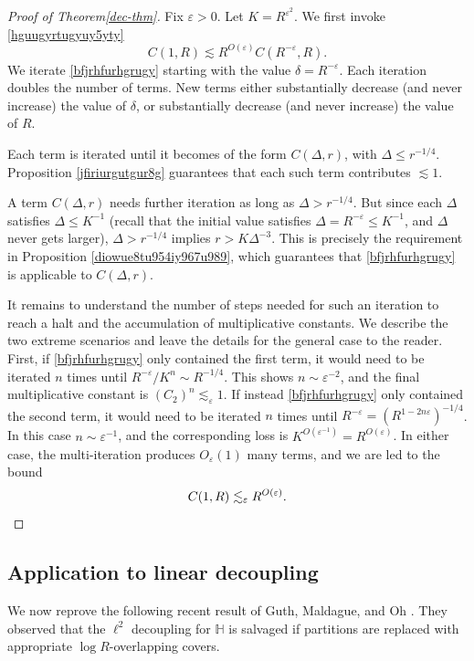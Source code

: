 \documentclass{amsart}%
\numberwithin{equation}{section}
\newcommand{\e}{\varepsilon}
\newcommand{\ZH}{\mathbb{H}}
\newcommand{\1}{\mathbbm{1}}
\begin{document}
	\begin{proof}[Proof of Theorem\ref{dec-thm}]
		Fix $\e>0$. Let $K=R^{\e^{2}}$. We first invoke \eqref{hguugyrtugyuy5yty}
		$$C(1,R)\lesssim R^{O(\e)}C(R^{-\e},R).$$
		We iterate \eqref{bfjrhfurhgrugy} starting with the value $\delta= R^{-\e}$. Each iteration doubles the number of terms. New terms either substantially decrease (and never increase) the value of $\delta$, or substantially decrease (and never increase) the value of $R$.
		
		Each term is iterated until it becomes of the form $C(\Delta, r)$, with $\Delta\le r^{-1/4}$. Proposition \ref{jfiriurgutgur8g} guarantees that each such term contributes $\lesssim 1$.
		
		A term $C(\Delta,r)$ needs further iteration as long as $\Delta>r^{-1/4}$. But since each $\Delta$ satisfies $\Delta\le K^{-1}$ (recall that the initial value satisfies $\Delta=R^{-\e}\le K^{-1}$, and $\Delta$ never gets larger), $\Delta>r^{-1/4}$ implies $r>K\Delta^{-3}$. This is precisely the requirement in Proposition \ref{diowue8tu954iy967u989}, which guarantees that \eqref{bfjrhfurhgrugy} is applicable to $C(\Delta,r)$.  
		
		It remains to understand the number of steps needed for such an iteration to reach a halt and  the accumulation of multiplicative constants. We describe the two extreme scenarios and leave the details for the general case to the reader. First, if \eqref{bfjrhfurhgrugy} only contained the first term, it would need to be iterated $n$ times until $R^{-\e}/K^n\sim R^{-1/4}$. This shows $n\sim \e^{-2}$, and the final multiplicative constant is $(C_2)^{n}\lesssim_\e 1$. If instead \eqref{bfjrhfurhgrugy} only contained the second term, it would need to be iterated $n$ times until $R^{-\e}=(R^{1-2n\e})^{-1/4}$. In this case $n\sim \e^{-1}$, and the corresponding loss is $K^{O(\e^{-1})}=R^{O(\e)}$. In either case, the multi-iteration produces $O_\e(1)$ many terms, and  we are led to the bound
		\[C(1,R)\lesssim_\e R^{O(\e)}. \qedhere\]
		
	\end{proof}
    \medskip

    \subsection{Application to linear decoupling}
    \label{app-linear-dec-sec}
    
    We now reprove the following recent result of Guth, Maldague, and Oh \cite{GMO}.
    They observed that the $\ell^2$ decoupling for $\ZH$ is salvaged if partitions are replaced with appropriate $\log R$-overlapping covers. 
    
\end{document}
